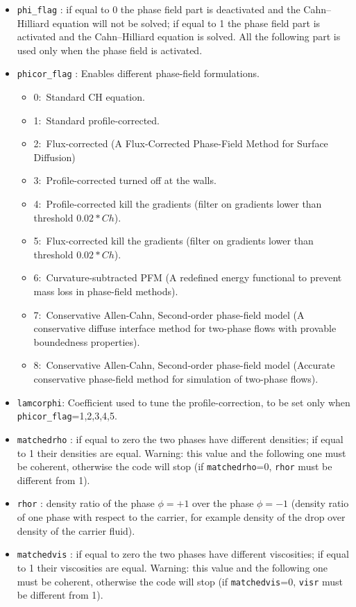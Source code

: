 \begin{itemize}
\item \texttt{phi\_flag} : if equal to 0 the phase field part is deactivated and the Cahn--Hilliard equation will not be solved; if equal to 1 the phase field part is activated and the Cahn--Hilliard equation is solved. All the following part is used only when the phase field is activated.
\item \texttt{phicor\_flag} : Enables different phase-field formulations.
\begin{itemize}[label={$\circ$}]
\item 0:~Standard CH equation.
\item 1:~Standard profile-corrected.
\item 2:~Flux-corrected (A Flux-Corrected Phase-Field Method for Surface Diffusion)
\item 3:~Profile-corrected turned off at the walls.
\item 4:~Profile-corrected kill the gradients (filter on gradients lower than threshold $0.02*Ch$).
\item 5:~Flux-corrected kill the gradients (filter on gradients lower than threshold $0.02*Ch$).
\item 6:~Curvature-subtracted PFM (A redefined energy functional to prevent mass loss in phase-field methods).
\item 7:~Conservative Allen-Cahn, Second-order phase-field model (A conservative diffuse interface method for two-phase flows with provable boundedness properties).
\item 8:~Conservative Allen-Cahn, Second-order phase-field model (Accurate conservative phase-field method for simulation of two-phase flows).
\end{itemize}
\item \texttt{lamcorphi}: Coefficient used to tune the profile-correction, to be set only when \texttt{phicor\_flag}=1,2,3,4,5.
\item \texttt{matchedrho} : if equal to zero the two phases have different densities; if equal to 1 their densities are equal. Warning: this value and the following one must be coherent, otherwise the code will stop (if \texttt{matchedrho}=0, \texttt{rhor} must be different from 1).
\item \texttt{rhor} : density ratio of the phase $\phi=+1$ over the phase $\phi=-1$ (density ratio of one phase with respect to the carrier, for example density of the drop over density of the carrier fluid).
\item \texttt{matchedvis} : if equal to zero the two phases have different viscosities; if equal to 1 their viscosities are equal. Warning: this value and the following one must be coherent, otherwise the code will stop (if \texttt{matchedvis}=0, \texttt{visr} must be different from 1).

\end{itemize}
